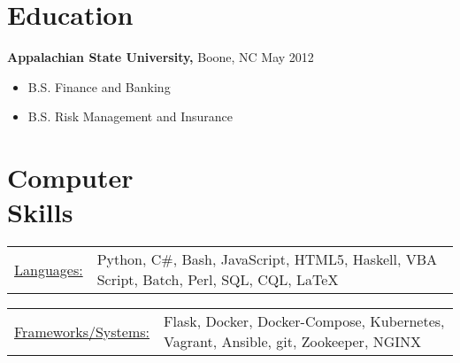 \documentclass{res}
\begin{document}
\begin{resume}
    
\section{Education} 
  {\bf Appalachian State University,} Boone, NC \hfill May 2012
    \begin{itemize} \itemsep -2pt
      \item B.S. Finance and Banking
      \item B.S. Risk Management and Insurance
    \end{itemize}

\section{Computer \\ Skills}
   \begin{tabular}{l p{5in}}
    \underline{Languages:} & \raggedright Python, C\#, Bash, JavaScript, HTML5, Haskell, VBA Script, Batch, Perl, SQL, CQL, \LaTeX\\
   \end{tabular}
   \begin{tabular}{l p{5in}}
    \underline{Frameworks/Systems:} & \raggedright Flask, Docker, Docker-Compose, Kubernetes, Vagrant, Ansible, git, Zookeeper, NGINX
 \end{tabular}
\end{resume} 
\end{document}
